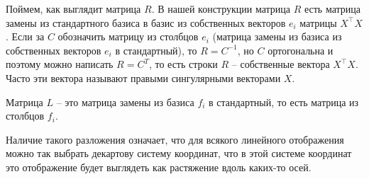 Поймем, как выглядит матрица $R$. В нашей конструкции матрица $R$ есть матрица замены из стандартного базиса в базис из собственных векторов $e_i$ матрицы $X^{\top}X$. Если за $C$ обозначить матрицу из столбцов $e_i$ (матрица замены из базиса из собственных векторов $e_i$ в стандартный), то $R=C^{-1}$, но $C$ ортогональна и поэтому можно написать $R=C^{T}$, то есть строки $R$ -- собственные вектора $X^{\top}X$. Часто эти вектора называют правыми сингулярными векторами $X$.

Матрица $L$ -- это матрица замены из базиса $f_i$ в стандартный, то есть матрица из столбцов $f_i$.

\endproof
\ethrm

Наличие такого разложения означает, что для всякого линейного отображения можно так выбрать декартову систему координат, что в этой системе координат это отображение будет выглядеть как растяжение вдоль каких-то осей.